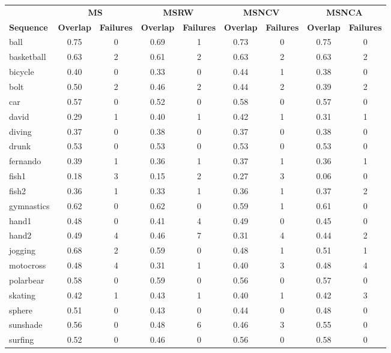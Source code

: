 \documentclass[a4paper]{article}
\begin{document}
\begin{table}[h]
	\begin{center}
		\begin{tabular}{l c c c c c c c c}
			\hline 
			& \multicolumn{2}{c}{{\bf MS}}& \multicolumn{2}{c}{{\bf MSRW}}& \multicolumn{2}{c}{{\bf MSNCV}}& \multicolumn{2}{c}{{\bf MSNCA}}\\
			{\bf Sequence} & {\bf Overlap} & {\bf Failures} & {\bf Overlap} & {\bf Failures} & {\bf Overlap} & {\bf Failures} & {\bf Overlap} & {\bf Failures} \\
			\hline 
			ball & 0.75 & 0 & 0.69 & 1 & 0.73 & 0 & 0.75 & 0\\
			basketball & 0.63 & 2 & 0.61 & 2 & 0.63 & 2 & 0.63 & 2\\
			bicycle & 0.40 & 0 & 0.33 & 0 & 0.44 & 1 & 0.38 & 0\\
			bolt & 0.50 & 2 & 0.46 & 2 & 0.44 & 2 & 0.39 & 2\\
			car & 0.57 & 0 & 0.52 & 0 & 0.58 & 0 & 0.57 & 0\\
			david & 0.29 & 1 & 0.40 & 1 & 0.42 & 1 & 0.31 & 1\\
			diving & 0.37 & 0 & 0.38 & 0 & 0.37 & 0 & 0.38 & 0\\
			drunk & 0.53 & 0 & 0.53 & 0 & 0.53 & 0 & 0.53 & 0\\
			fernando & 0.39 & 1 & 0.36 & 1 & 0.37 & 1 & 0.36 & 1\\
			fish1 & 0.18 & 3 & 0.15 & 2 & 0.27 & 3 & 0.06 & 0\\
			fish2 & 0.36 & 1 & 0.33 & 1 & 0.36 & 1 & 0.37 & 2\\
			gymnastics & 0.62 & 0 & 0.62 & 0 & 0.59 & 1 & 0.61 & 0\\
			hand1 & 0.48 & 0 & 0.41 & 4 & 0.49 & 0 & 0.45 & 0\\
			hand2 & 0.49 & 4 & 0.46 & 7 & 0.31 & 4 & 0.44 & 2\\
			jogging & 0.68 & 2 & 0.59 & 0 & 0.48 & 1 & 0.51 & 1\\
			motocross & 0.48 & 4 & 0.31 & 1 & 0.40 & 3 & 0.48 & 4\\
			polarbear & 0.58 & 0 & 0.59 & 0 & 0.56 & 0 & 0.57 & 0\\
			skating & 0.42 & 1 & 0.43 & 1 & 0.40 & 1 & 0.42 & 3\\
			sphere & 0.51 & 0 & 0.43 & 0 & 0.44 & 0 & 0.48 & 0\\
			sunshade & 0.56 & 0 & 0.48 & 6 & 0.46 & 3 & 0.55 & 0\\
			surfing & 0.52 & 0 & 0.46 & 0 & 0.56 & 0 & 0.58 & 0\\

\end{tabular}
\end{center}
\end{table}
\end{document}
